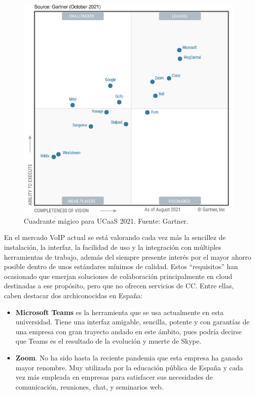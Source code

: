 \documentclass[a4paper, 12pt]{book}
\begin{document}
\begin{figure}[h]
  \centering
  \includegraphics{img/fig_gartner_2021}
  \caption{Cuadrante mágico para UCaaS 2021. Fuente: Gartner.}
  \label{figura:fig_gartner}
\end{figure}

En el mercado VoIP actual se está valorando cada vez más la sencillez de instalación, la interfaz, la facilidad de uso y la integración con múltiples herramientas de trabajo, además del siempre presente interés por el mayor ahorro posible dentro de unos estándares mínimos de calidad. Estos ``requisitos'' han ocasionado que emerjan soluciones de colaboración principalmente en cloud destinadas a ese propósito, pero que no ofrecen servicios de CC. Entre ellas, caben destacar dos archiconocidas en España:
\begin{itemize}
  \item \textbf{Microsoft Teams} es la herramienta que se usa actualmente en esta universidad. Tiene una interfaz amigable, sencilla, potente y con garantías de una empresa con gran trayecto andado en este ámbito, pues podría decirse que Teams es el resultado de la evolución y muerte de Skype.  

  \item \textbf{Zoom}. No ha sido hasta la reciente pandemia que esta empresa ha ganado mayor renombre. Muy utilizada por la educación pública de España y cada vez más empleada en empresas para satisfacer sus necesidades de comunicación, reuniones, chat, y seminarios web.
\end{itemize}
  
\end{document}
